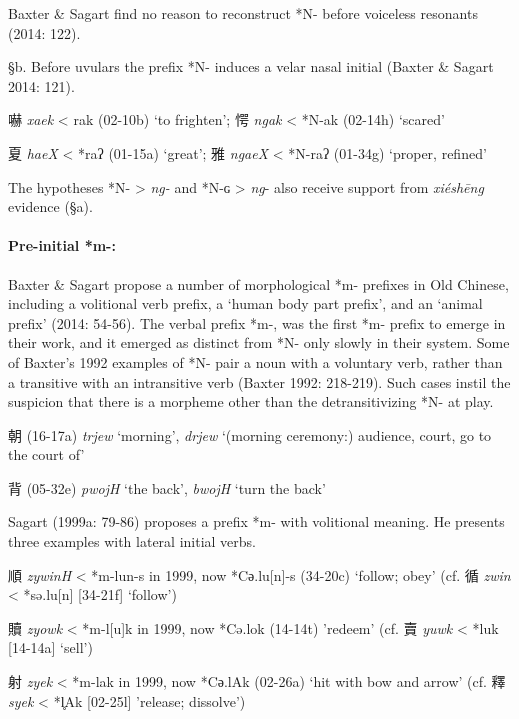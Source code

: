 Baxter \& Sagart find no reason to reconstruct *N- before voiceless
resonants (2014: 122).

§b. Before uvulars the prefix *N- induces a velar nasal initial (Baxter
\& Sagart 2014: 121).

\begin{description} \item
嚇  \emph{xaek} \textless{} {}{}rak (02-10b) `to frighten'; 愕
\emph{ngak} \textless{} *N-{}{}ak (02-14h) `scared'
\item
夏  \emph{haeX} \textless{} *{}raʔ (01-15a) `great'; 雅
 \emph{ngaeX} \textless{} *N-{}raʔ (01-34g) `proper, refined'
\end{description}

The hypotheses *N-{} \textgreater{} \emph{ng-} and *N-ɢ \textgreater{}
 \emph{ng}- also receive support from  \emph{xiéshēng} evidence (§a).

\paragraph{Pre-initial *m-:} Baxter \& Sagart
propose a number of morphological *m- prefixes in Old Chinese, including
a volitional verb prefix, a `human body part prefix', and an `animal
prefix' (2014: 54-56). The verbal prefix *m-, was the first *m- prefix
to emerge in their work, and it emerged as distinct from *N- only slowly
in their system. Some of Baxter's 1992 examples of *N- pair a noun with
a voluntary verb, rather than a transitive with an intransitive verb
(Baxter 1992: 218-219). Such cases instil the suspicion that there is a
morpheme other than the detransitivizing *N- at play.

\begin{description} \item
朝 (16-17a) \emph{trjew} `morning',  \emph{drjew} `(morning ceremony:)
audience, court, go to the court of'

\item
背 (05-32e) \emph{pwojH} `the back',  \emph{bwojH} `turn the back'
\end{description}

Sagart (1999a: 79-86) proposes a prefix *m- with volitional meaning. He
presents three examples with lateral initial verbs.

\begin{description} \item
順  \emph{zywinH} \textless{} *m-lun-s in 1999, now *Cә.lu[n]-s
(34-20c) `follow; obey' (cf. 循  \emph{zwin} \textless{} *sə.lu[n]
{[}34-21f] `follow')

\item
贖  \emph{zyowk} \textless{} *m-l{[}u]k in 1999, now *Cə.lok (14-14t)
'redeem' (cf. 賣 \emph{yuwk} \textless{} *luk {[}14-14a] `sell')

\item
射  \emph{zyek} \textless{} *m-lak in 1999, now *Cә.lAk (02-26a) `hit
with bow and arrow' (cf. 釋  \emph{syek} \textless{} *l̥Ak {[}02-25l]
'release; dissolve')
\end{description}

